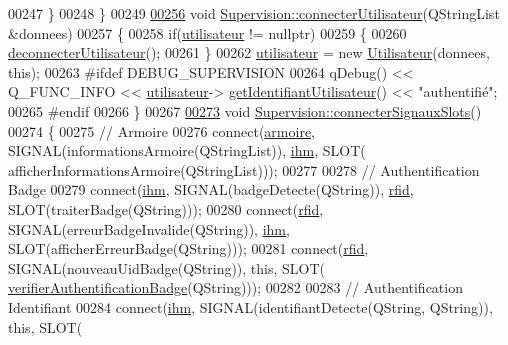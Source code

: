 \begin{DoxyCode}
{00247     \}
00248 \}
00249 
\hyperlink{class_supervision_a7c397ca5f79afa2709a657d7185dfbe1}{00256} \textcolor{keywordtype}{void} \hyperlink{class_supervision_a7c397ca5f79afa2709a657d7185dfbe1}{Supervision::connecterUtilisateur}(QStringList &donnees)
00257 \{
00258     \textcolor{keywordflow}{if}(\hyperlink{class_supervision_a92384f2b12b2549cee988f83add8ad49}{utilisateur} != \textcolor{keyword}{nullptr})
00259     \{
00260         \hyperlink{class_supervision_a164a1ad89264ea252401818df325eab8}{deconnecterUtilisateur}();
00261     \}
00262     \hyperlink{class_supervision_a92384f2b12b2549cee988f83add8ad49}{utilisateur} = \textcolor{keyword}{new} \hyperlink{class_utilisateur}{Utilisateur}(donnees, \textcolor{keyword}{this});
00263 \textcolor{preprocessor}{    #ifdef DEBUG\_SUPERVISION}
00264         qDebug() << Q\_FUNC\_INFO << \hyperlink{class_supervision_a92384f2b12b2549cee988f83add8ad49}{utilisateur}->
      \hyperlink{class_utilisateur_af944ac02cca7914480e20f46c4dd0e56}{getIdentifiantUtilisateur}() << \textcolor{stringliteral}{"authentifié"};
00265 \textcolor{preprocessor}{    #endif}
00266 \}
00267 
\hyperlink{class_supervision_ac3bb2f3834b09a81ae9a767502ff693b}{00273} \textcolor{keywordtype}{void} \hyperlink{class_supervision_ac3bb2f3834b09a81ae9a767502ff693b}{Supervision::connecterSignauxSlots}()
00274 \{
00275     \textcolor{comment}{// Armoire}
00276     connect(\hyperlink{class_supervision_a9f974b5c47899192395e539a0f11034c}{armoire}, SIGNAL(informationsArmoire(QStringList)), \hyperlink{class_supervision_a5aa823c55bf1531497bbb8fdbc6c5528}{ihm}, SLOT(
      afficherInformationsArmoire(QStringList)));
00277 
00278     \textcolor{comment}{// Authentification Badge}
00279     connect(\hyperlink{class_supervision_a5aa823c55bf1531497bbb8fdbc6c5528}{ihm}, SIGNAL(badgeDetecte(QString)), \hyperlink{class_supervision_a3ec5986105208e9a2b02b7e97bf61090}{rfid}, SLOT(traiterBadge(QString)));
00280     connect(\hyperlink{class_supervision_a3ec5986105208e9a2b02b7e97bf61090}{rfid}, SIGNAL(erreurBadgeInvalide(QString)), \hyperlink{class_supervision_a5aa823c55bf1531497bbb8fdbc6c5528}{ihm}, SLOT(afficherErreurBadge(QString)));
00281     connect(\hyperlink{class_supervision_a3ec5986105208e9a2b02b7e97bf61090}{rfid}, SIGNAL(nouveauUidBadge(QString)), \textcolor{keyword}{this}, SLOT(
      \hyperlink{class_supervision_a07e7f0cd8b114182be56ebb5645e62fe}{verifierAuthentificationBadge}(QString)));
00282 
00283     \textcolor{comment}{// Authentification Identifiant}
00284     connect(\hyperlink{class_supervision_a5aa823c55bf1531497bbb8fdbc6c5528}{ihm}, SIGNAL(identifiantDetecte(QString, QString)), \textcolor{keyword}{this}, SLOT(
}
\end{DoxyCode}

